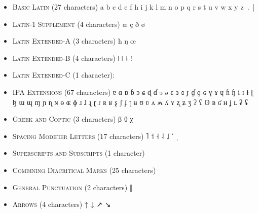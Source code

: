 \begin{itemize}[itemsep=4pt]
	\item \textsc{Basic Latin }(27 characters) \newline 
	a b c d e f h i j k l m n o p q r s t u v w x y z~.~|
	\item \textsc{Latin-1 Supplement} (4 characters) \newline 
	æ ç ð ø
	\item \textsc{Latin Extended-A} (3 characters) \newline 
	ħ ŋ œ
	\item \textsc{Latin Extended-B} (4 characters) \newline 
	ǀ ǁ ǂ ǃ
	\item \textsc{Latin Extended-C} (1 character): \newline
	\item \textsc{IPA Extensions} (67 characters) \newline 
	ɐ ɑ ɒ ɓ ɔ ɕ ɖ ɗ ɘ ə ɛ ɜ ɞ ɟ ɠ ɡ ɢ ɣ ɤ ɥ ɦ ɧ ɨ ɪ ɬ ɭ ɮ ɯ ɰ ɱ ɲ ɳ ɴ \newline
	ɵ ɶ ɸ ɹ ɺ ɻ ɽ ɾ ʀ ʁ ʂ ʃ ʄ ʈ ʉ ʊ ʋ ʌ ʍ ʎ ʏ ʐ ʑ ʒ ʔ ʕ ʘ ʙ ʛ ʜ ʝ ʟ ʡ ʢ 
	\item \textsc{Greek and Coptic} (3 characters) \newline 
	β θ χ
	\item \textsc{Spacing Modifier Letters} (17 characters) \newline
	      
	    ˥ ˦ ˧ ˨ ˩ {\large ˈ ˌ}
	\item \textsc{Superscripts and Subscripts} (1 character) \newline
	\item \textsc{Combining Diacritical Marks} (25 characters) \newline 
	       
	       
	       
	   \ 
    \item \textsc{General Punctuation} (2 characters) \newline 
    ‖ 
	\item \textsc{Arrows} (4 characters) \newline 
	↑ ↓ ↗ ↘

\end{itemize}

